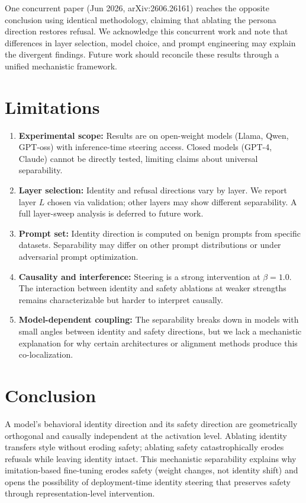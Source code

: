 \documentclass[letterpaper,twocolumn]{article}
\begin{document}
One concurrent paper (Jun 2026, arXiv:2606.26161) reaches the opposite conclusion using identical methodology, claiming that ablating the persona direction restores refusal. We acknowledge this concurrent work and note that differences in layer selection, model choice, and prompt engineering may explain the divergent findings. Future work should reconcile these results through a unified mechanistic framework.

\section{Limitations}

\begin{enumerate}
\item \textbf{Experimental scope:} Results are on open-weight models (Llama, Qwen, GPT-oss) with inference-time steering access. Closed models (GPT-4, Claude) cannot be directly tested, limiting claims about universal separability.

\item \textbf{Layer selection:} Identity and refusal directions vary by layer. We report layer $L$ chosen via validation; other layers may show different separability. A full layer-sweep analysis is deferred to future work.

\item \textbf{Prompt set:} Identity direction is computed on benign prompts from specific datasets. Separability may differ on other prompt distributions or under adversarial prompt optimization.

\item \textbf{Causality and interference:} Steering is a strong intervention at $\beta = 1.0$. The interaction between identity and safety ablations at weaker strengths remains characterizable but harder to interpret causally.

\item \textbf{Model-dependent coupling:} The separability breaks down in models with small angles between identity and safety directions, but we lack a mechanistic explanation for why certain architectures or alignment methods produce this co-localization.

\end{enumerate}

\section{Conclusion}

A model's behavioral identity direction and its safety direction are geometrically orthogonal and causally independent at the activation level. Ablating identity transfers style without eroding safety; ablating safety catastrophically erodes refusals while leaving identity intact. This mechanistic separability explains why imitation-based fine-tuning erodes safety (weight changes, not identity shift) and opens the possibility of deployment-time identity steering that preserves safety through representation-level intervention.
\end{document}
